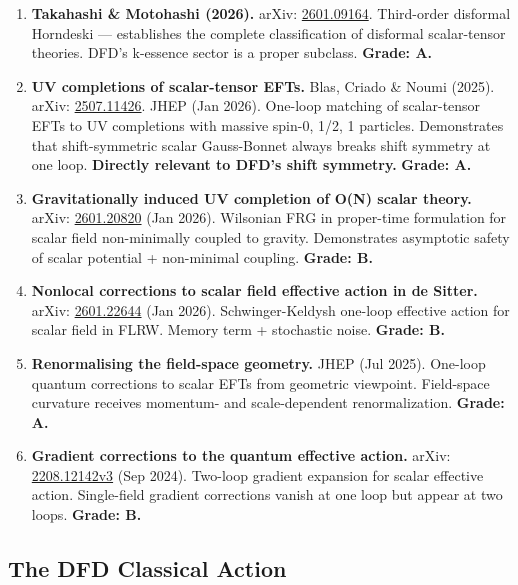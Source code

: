 \documentclass[11pt,a4paper]{article}
\begin{document}
\begin{enumerate}
\item \textbf{Takahashi \& Motohashi (2026).} arXiv: \href{https://arxiv.org/abs/2601.09164}{2601.09164}. Third-order disformal Horndeski --- establishes the complete classification of disformal scalar-tensor theories. DFD's k-essence sector is a proper subclass. \textbf{Grade: A.}

\item \textbf{UV completions of scalar-tensor EFTs.} Blas, Criado \& Noumi (2025). arXiv: \href{https://arxiv.org/abs/2507.11426}{2507.11426}. JHEP (Jan 2026). One-loop matching of scalar-tensor EFTs to UV completions with massive spin-0, 1/2, 1 particles. Demonstrates that shift-symmetric scalar Gauss-Bonnet always breaks shift symmetry at one loop. \textbf{Directly relevant to DFD's shift symmetry.} \textbf{Grade: A.}

\item \textbf{Gravitationally induced UV completion of O(N) scalar theory.} arXiv: \href{https://arxiv.org/abs/2601.20820}{2601.20820} (Jan 2026). Wilsonian FRG in proper-time formulation for scalar field non-minimally coupled to gravity. Demonstrates asymptotic safety of scalar potential + non-minimal coupling. \textbf{Grade: B.}

\item \textbf{Nonlocal corrections to scalar field effective action in de Sitter.} arXiv: \href{https://arxiv.org/abs/2601.22644}{2601.22644} (Jan 2026). Schwinger-Keldysh one-loop effective action for scalar field in FLRW. Memory term + stochastic noise. \textbf{Grade: B.}

\item \textbf{Renormalising the field-space geometry.} JHEP (Jul 2025). One-loop quantum corrections to scalar EFTs from geometric viewpoint. Field-space curvature receives momentum- and scale-dependent renormalization. \textbf{Grade: A.}

\item \textbf{Gradient corrections to the quantum effective action.} arXiv: \href{https://arxiv.org/abs/2208.12142}{2208.12142v3} (Sep 2024). Two-loop gradient expansion for scalar effective action. Single-field gradient corrections vanish at one loop but appear at two loops. \textbf{Grade: B.}
\end{enumerate}

\subsection{The DFD Classical Action}
\end{document}
